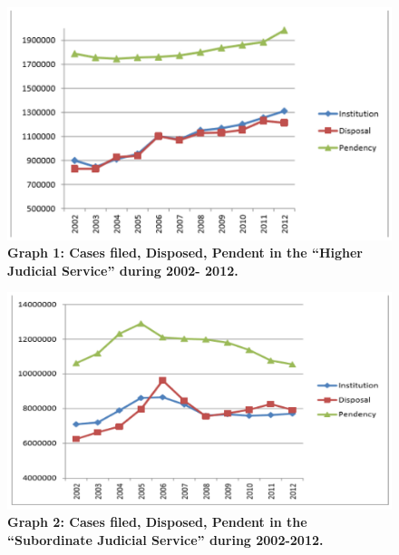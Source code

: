 \vspace{-.4cm}

\begin{figure}
\centering
\includegraphics[scale=.85]{src/images/chap5/001.eps}
\caption*{\textbf{Graph 1: Cases filed, Disposed, Pendent in the “Higher Judicial Service” during 2002-
2012.}}\label{fig01}
\end{figure}

\vspace{-.4cm}

\begin{figure}
\centering
\includegraphics[scale=.85]{src/images/chap5/002.eps}
\caption*{\textbf{Graph 2: Cases filed, Disposed, Pendent in the “Subordinate Judicial Service” during
2002-2012.}}\label{fig02}
\end{figure}

\newpage

